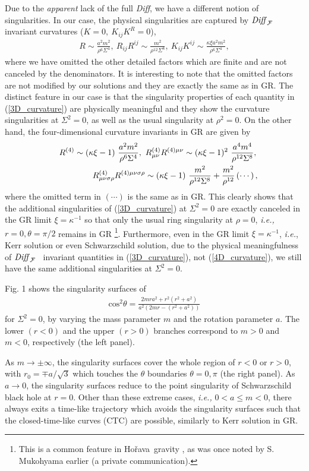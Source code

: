 \documentclass[preprint,aps,tightenlines,showkeys,nofootinbib,superscriptaddress]{revtex4}
\newcommand{\beq}{\begin{eqnarray}}
\newcommand{\eeq}{\end{eqnarray}}
\newcommand{\ka}{\kappa}
\newcommand{\m}{{\mu}}
\newcommand{\n}{{\nu}}
\newcommand{\si}{{\sigma}}
\newcommand{\Si}{{\Sigma}}
\newcommand{\no}{{\nonumber}}
\newcommand{\f}{\frac}
\newcommand{\ra}{\rightarrow}
\newcommand{\Sch}{Schwarzschild }
\newcommand{\Ho}{Ho\v{r}ava}
\newcommand{\DiffF}{${\it Diff}_{\cal F}$}
\begin{document}
Due to the {\it apparent} lack of the full {\it Diff}, we have a different notion of singularities. In our case, the physical singularities are captured by \DiffF~ invariant
curvatures 
($K=0,~K_{ij} K^{R}=0$),
\beq
R \sim \f{a^2 m^2}{\rho^6 \Si^4},~R_{ij} R^{ij} \sim \f{m^2}{\rho^{12} \Si^8},~K_{ij} K^{ij} \sim \f{\ka \xi a^2 m^2}{\rho^6 \Si^4},
\label{3D_curvature}
\eeq
where we have omitted the other detailed factors which are finite and
are not canceled by the denominators. It is interesting to note that the
omitted factors are not modified by our solutions and they are exactly the
same as in GR. The distinct feature in our case is that the singularity
properties of each quantity in (\ref{3D_curvature}) are physically meaningful
and they show the curvature singularities at $\Si^2=0$, as well as the usual
singularity at $\rho^2=0$. On the other hand, the four-dimensional curvature invariants in GR are given by
\beq
&&R^{(4)} \sim (\ka \xi-1)~ \f{a^2 m^2}{\rho^6 \Si^4},~R^{(4)}_{\m \n} R^{(4) \m \n} \sim (\ka \xi-1)^2~ \f{a^4 m^4}{\rho^{12} \Si^8},\no \\
&&R^{(4)}_{\m \n \si \rho} R^{(4) \m \n \si \rho} \sim (\ka \xi-1)~ \f{m^2}{\rho^{12} \Si^8}+\f{m^2}{\rho^{12}} \left(\cdots\right),
\label{4D_curvature}
\eeq
where the omitted term in $\left(\cdots\right)$ is the same as in GR. This clearly shows that the additional singularities of (\ref{3D_curvature}) at $\Si^2=0$ are exactly canceled in the GR limit $\xi =\ka^{-1}$ so that only the usual
ring singularity at $\rho=0$, {\it i.e.,} $r=0, \theta=\pi/2$ remains in GR \footnote{This is a common feature in \Ho~gravity \cite{Lu:2009,Park:2012}, as was once noted by S. Mukohyama earlier (a private communication). }. Furthermore, even in the GR limit $\xi =\ka^{-1}$, {\it i.e.}, Kerr solution or even \Sch solution, due to the physical meaningfulness of \DiffF~ invariant quantities in (\ref{3D_curvature}), not (\ref{4D_curvature}), we still have the same additional singularities at $\Si^2=0$.

Fig. 1 shows the singularity surfaces of
\beq
\mbox{cos}^2\theta=\f{2mr a^2 +r^2 (r^2+a^2)}{a^2 (2 mr -(r^2+a^2))}
\eeq
for $\Si^2=0$, by varying the mass parameter $m$ and the rotation parameter $a$. The lower $(r<0)$ and the upper $(r>0)$ branches correspond to $m>0$ and $m<0$, respectively (the left panel).

As $m \ra \pm \infty$, the singularity surfaces cover the whole region of $r<0$ or $r>0$, with $r_0=\mp a/\sqrt{3}$ which touches the $\theta$ boundaries $\theta=0, \pi$
(the right panel).
As $a \ra 0$, the singularity surfaces reduce to the point singularity of \Sch black hole at $r=0$. Other than these extreme cases, {\it i.e.,} $0<a \leq m <0$, there always exits a time-like trajectory which avoids the singularity surfaces such that the closed-time-like curves (CTC) are possible, similarly to Kerr solution in GR.
\end{document}
